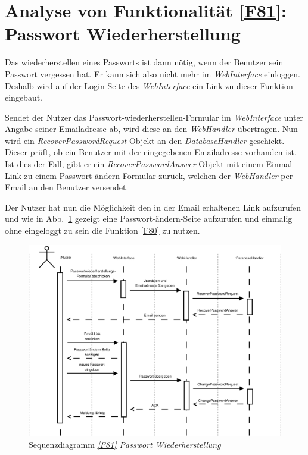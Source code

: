 \section{Analyse von Funktionalität \ref{F81}: Passwort Wiederherstellung}

Das wiederherstellen eines Passworts ist dann nötig, wenn der Benutzer sein
Passwort vergessen hat. Er kann sich also nicht mehr im \textit{WebInterface}
einloggen. Deshalb wird auf der Login-Seite des \textit{WebInterface} ein Link
zu dieser Funktion eingebaut.

Sendet der Nutzer das Passwort-wiederherstellen-Formular im
\textit{WebInterface} unter Angabe seiner Emailadresse ab, wird diese an den
\textit{WebHandler} übertragen. Nun wird ein
\textit{RecoverPasswordRequest}-Objekt an den \textit{DatabaseHandler}
geschickt. Dieser prüft, ob ein Benutzer mit der eingegebenen Emailadresse
vorhanden ist. Ist dies der Fall, gibt er ein
\textit{RecoverPasswordAnswer}-Objekt mit einem Einmal-Link zu einem
Passwort-ändern-Formular zurück, welchen der \textit{WebHandler} per Email an
den Benutzer versendet.

Der Nutzer hat nun die Möglichkeit den in der Email erhaltenen Link aufzurufen
und wie in Abb.~\ref{sd81} gezeigt eine Passwort-ändern-Seite aufzurufen und
einmalig ohne eingeloggt zu sein die Funktion \ref{F80} zu nutzen.

\begin{figure}[h]
\centering
\includegraphics[width=1\textwidth]{Systementwurf/02_produktfunktionsanalyse/f810}
\caption{Sequenzdiagramm \textit{\ref{F81} Passwort Wiederherstellung}
\label{sd81}}
\end{figure}

